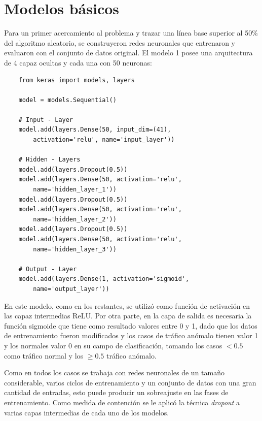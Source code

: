 \section{Modelos básicos}
Para un primer acercamiento al problema y trazar una línea base superior al 50\% del algoritmo aleatorio, se construyeron redes neuronales que entrenaron y evaluaron con el conjunto de datos original. El modelo 1 posee una arquitectura de 4 capaz ocultas y cada una con 50 neuronas:
\begin{verbatim}
    from keras import models, layers

    model = models.Sequential()

    # Input - Layer
    model.add(layers.Dense(50, input_dim=(41), 
        activation='relu', name='input_layer'))

    # Hidden - Layers
    model.add(layers.Dropout(0.5))
    model.add(layers.Dense(50, activation='relu', 
        name='hidden_layer_1'))
    model.add(layers.Dropout(0.5))
    model.add(layers.Dense(50, activation='relu', 
        name='hidden_layer_2'))
    model.add(layers.Dropout(0.5))
    model.add(layers.Dense(50, activation='relu', 
        name='hidden_layer_3'))

    # Output - Layer
    model.add(layers.Dense(1, activation='sigmoid', 
        name='output_layer'))
\end{verbatim}

En este modelo, como en los restantes, se utilizó como función de activación en las capaz intermedias ReLU. Por otra parte, en la capa de salida es necesaria la función sigmoide que tiene como resultado valores entre 0 y 1, dado que los datos de entrenamiento fueron modificados y los casos de tráfico anómalo tienen valor 1 y los normales valor 0 en su campo de clasificación, tomando los casos $< 0.5$ como tráfico normal y los $\geq 0.5$ tráfico anómalo.

Como en todos los casos se trabaja con redes neuronales de un tamaño considerable, varios ciclos de entrenamiento y un conjunto de datos con una gran cantidad de entradas, esto puede producir un sobreajuste en las fases de entrenamiento. Como medida de contención se le aplicó la técnica \textit{dropout} a varias capas intermedias de cada uno de los modelos.

